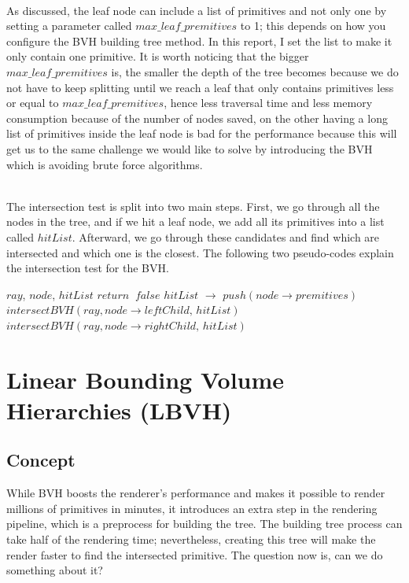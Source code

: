 \documentclass[11pt,a4paper]{article}
\begin{document}
\noindent
\\
As discussed, the leaf node can include a list of primitives and not only one by setting a parameter called $max\_leaf\_premitives$ to 1; this depends on how you configure the BVH building tree method. In this report, I set the list to make it only contain one primitive. It is worth noticing that the bigger $max\_leaf\_premitives$ is, the smaller the depth of the tree becomes because we do not have to keep splitting until we reach a leaf that only contains primitives less or equal to $max\_leaf\_premitives$, hence less traversal time and less memory consumption because of the number of nodes saved, on the other having a long list of primitives inside the leaf node is bad for the performance because this will get us to the same challenge we would like to solve by introducing the BVH which is avoiding brute force algorithms.

\noindent
\\
The intersection test is split into two main steps. First, we go through all the nodes in the tree, and if we hit a leaf node, we add all its primitives into a list called $hitList$. Afterward, we go through these candidates and find which are intersected and which one is the closest. The following two pseudo-codes explain the intersection test for the BVH. 


\begin{algorithm}[H]
	\caption{$intersectBVH$}\label{alg:alg1}
	\begin{algorithmic}
		\Require $ray$, $node$, $hitList$
			\State $return\;\;false$
		\EndIf
		    \State $hitList$ $\rightarrow$ $push(node \rightarrow premitives)$
		\Else
			\State $intersectBVH(ray, node \rightarrow leftChild,\, hitList)$
			\State $intersectBVH(ray, node \rightarrow rightChild,\, hitList)$
		\EndIf
	\end{algorithmic}
\end{algorithm}

\clearpage

\section{Linear Bounding Volume Hierarchies (LBVH)}
\subsection{Concept}
While BVH boosts the renderer's performance and makes it possible to render millions of primitives in minutes, it introduces an extra step in the rendering pipeline, which is a preprocess for building the tree. The building tree process can take half of the rendering time; nevertheless, creating this tree will make the render faster to find the intersected primitive. The question now is, can we do something about it? 
\end{document}
